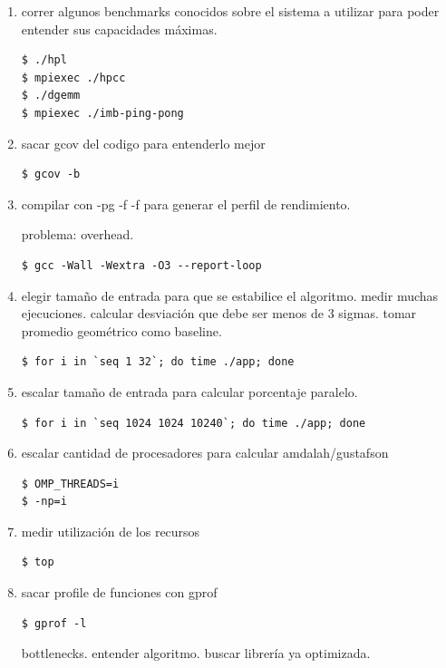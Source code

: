 \documentclass[a4paper]{report}
\begin{document}
\begin{enumerate}
\item correr algunos benchmarks conocidos sobre el sistema a utilizar para poder entender sus capacidades m\'aximas.

\begin{verbatim}
$ ./hpl
$ mpiexec ./hpcc
$ ./dgemm
$ mpiexec ./imb-ping-pong
\end{verbatim}

\item sacar gcov del codigo para entenderlo mejor

\begin{verbatim}
$ gcov -b
\end{verbatim}

\item compilar con -pg -f -f para generar el perfil de rendimiento.

problema: overhead.

\begin{verbatim}
$ gcc -Wall -Wextra -O3 --report-loop
\end{verbatim}

\item elegir tama\~no de entrada para que se estabilice el algoritmo.
	medir muchas ejecuciones. calcular desviaci\'on que debe ser menos de 3
	sigmas. tomar promedio geom\'etrico como baseline.
	
\begin{verbatim}
$ for i in `seq 1 32`; do time ./app; done
\end{verbatim}
	
\item escalar tama\~no de entrada para calcular porcentaje paralelo.

\begin{verbatim}
$ for i in `seq 1024 1024 10240`; do time ./app; done
\end{verbatim}

\item escalar cantidad de procesadores para calcular amdalah/gustafson

\begin{verbatim}
$ OMP_THREADS=i
$ -np=i
\end{verbatim}

\item medir utilizaci\'on de los recursos

\begin{verbatim}
$ top
\end{verbatim}

\item sacar profile de funciones con gprof

\begin{verbatim}
$ gprof -l
\end{verbatim}

bottlenecks. entender algoritmo. buscar librer\'ia ya optimizada.

\end{enumerate}
\end{document}
